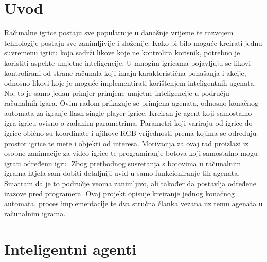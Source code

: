 \documentclass[a4paper,12pt]{foi}
\begin{document}
\maketitle

\tableofcontents

\thispagestyle{empty}

\setcounter{page}{0}

\onehalfspacing

\chapter{Uvod}
Računalne igrice postaju sve popularnije u današnje vrijeme te razvojem tehnologije postaju sve zanimljivije i složenije. Kako bi bilo moguće kreirati jednu suvremenu igricu koja sadrži likove koje ne kontrolira korisnik, potrebno je koristiti aspekte umjetne inteligencije. U mnogim igricama pojavljuju se likovi kontrolirani od strane računala koji imaju karakteristična ponašanja i akcije, odnosno likovi koje je moguće implementirati korištenjem inteligentnih agenata. No, to je samo jedan primjer primjene umjetne inteligencije u području računalnih igara. Ovim radom prikazuje se primjena agenata, odnosno konačnog automata za igranje flash single player igrice. Kreiran je agent koji samostalno igra igricu ovisno o zadanim parametrima. Parametri koji variraju od igrice do igrice obično su koordinate i njihove RGB vrijednosti prema kojima se određuju prostor igrice te mete i objekti od interesa.
\newline
Motivacija za ovaj rad proizlazi iz osobne zanimacije za video igrice te programiranje botova koji samostalno mogu igrati određenu igru. Zbog prethodnog susretanja s botovima u računalnim igrama htjela sam dobiti detaljniji uvid u samo funkcioniranje tih agenata. Smatram da je to područje veoma zanimljivo, ali također da postavlja određene izazove pred programera. Ovaj projekt opisuje kreiranje jednog konačnog automata, proces implementacije te dva stručna članka vezana uz temu agenata u računalnim igrama.

\chapter{Inteligentni agenti}
\end{document}

